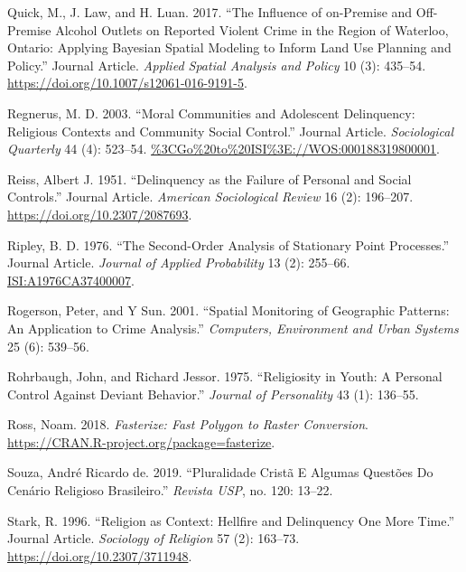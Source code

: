 \documentclass[smallextended]{svjour3}       %
\begin{document}
\leavevmode\hypertarget{ref-Quick2017influence}{}%
Quick, M., J. Law, and H. Luan. 2017. ``The Influence of on-Premise and
Off-Premise Alcohol Outlets on Reported Violent Crime in the Region of
Waterloo, Ontario: Applying Bayesian Spatial Modeling to Inform Land Use
Planning and Policy.'' Journal Article. \emph{Applied Spatial Analysis
and Policy} 10 (3): 435--54.
\url{https://doi.org/10.1007/s12061-016-9191-5}.

\leavevmode\hypertarget{ref-Regnerus2003moral}{}%
Regnerus, M. D. 2003. ``Moral Communities and Adolescent Delinquency:
Religious Contexts and Community Social Control.'' Journal Article.
\emph{Sociological Quarterly} 44 (4): 523--54.
\url{\%3CGo\%20to\%20ISI\%3E://WOS:000188319800001}.

\leavevmode\hypertarget{ref-Reiss1951delinquency}{}%
Reiss, Albert J. 1951. ``Delinquency as the Failure of Personal and
Social Controls.'' Journal Article. \emph{American Sociological Review}
16 (2): 196--207. \url{https://doi.org/10.2307/2087693}.

\leavevmode\hypertarget{ref-Ripley1976second}{}%
Ripley, B. D. 1976. ``The Second-Order Analysis of Stationary Point
Processes.'' Journal Article. \emph{Journal of Applied Probability} 13
(2): 255--66. \url{ISI:A1976CA37400007}.

\leavevmode\hypertarget{ref-Rogerson2001spatial}{}%
Rogerson, Peter, and Y Sun. 2001. ``Spatial Monitoring of Geographic
Patterns: An Application to Crime Analysis.'' \emph{Computers,
Environment and Urban Systems} 25 (6): 539--56.

\leavevmode\hypertarget{ref-Rohrbaugh1975religiosity}{}%
Rohrbaugh, John, and Richard Jessor. 1975. ``Religiosity in Youth: A
Personal Control Against Deviant Behavior.'' \emph{Journal of
Personality} 43 (1): 136--55.

\leavevmode\hypertarget{ref-Ross2018fasterize}{}%
Ross, Noam. 2018. \emph{Fasterize: Fast Polygon to Raster Conversion}.
\url{https://CRAN.R-project.org/package=fasterize}.

\leavevmode\hypertarget{ref-deSouza2019pluralidade}{}%
Souza, André Ricardo de. 2019. ``Pluralidade Cristã E Algumas Questões
Do Cenário Religioso Brasileiro.'' \emph{Revista USP}, no. 120: 13--22.

\leavevmode\hypertarget{ref-Stark1996religion}{}%
Stark, R. 1996. ``Religion as Context: Hellfire and Delinquency One More
Time.'' Journal Article. \emph{Sociology of Religion} 57 (2): 163--73.
\url{https://doi.org/10.2307/3711948}.
\end{document}
